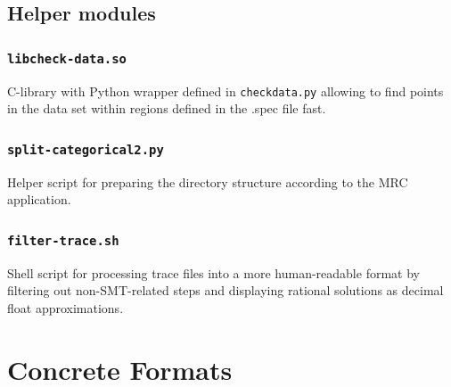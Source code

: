 \documentclass[a4paper,parskip=half]{article} %
\newcommand*\cmdstyle\texttt
\newcommand*\file\cmdstyle
\newcommand*\cmd[1]{\cmdstyle{\textcolor{red!85!black}{#1}}}
\newcommand{\delete}[1]{}
\begin{document}
{\subsection{Helper modules}
\subsubsection{\file{libcheck-data.so}}
C-library with Python wrapper defined in \file{checkdata.py} allowing to find
points in the data set within regions defined in the .spec file fast.

\subsubsection{\cmd{split-categorical2.py}}
Helper script for preparing the directory structure according to the MRC
application.

\subsubsection{\cmd{filter-trace.sh}}
Shell script for processing trace files into a more human-readable format by
filtering out non-SMT-related steps and displaying rational solutions as
decimal float approximations.

} %




\delete{
\begin{thebibliography}{99}
\bibitem{BKK20}
 F. Brauße, Z. Khasidashvili and K. Korovin.
\newblock{Selecting Stable Safe Configurations for Systems Modelled by Neural Networks with ReLU Activation.}
\newblock{2020 Formal Methods in Computer Aided Design, FMCAD 2020}
\newblock{IEEE, 2020}.

\bibitem{BKK22}
 F. Brauße, Z. Khasidashvili and K. Korovin.
\newblock{Combining Constraint Solving and Bayesian Techniques for System Optimization.}  
\newblock{31st International Joint Conference on Artificial Intelligence and the 25th European Conference on Artificial Intelligence, IJCAI-ECAI'22 2022.}


\bibitem{BKK24}
 F. Brauße, Z. Khasidashvili and K. Korovin.
\newblock{SMLP: Symbolic Machine Learning Prover.}
\newblock{Report arXiv: 2402.01415 , 2024.}
\end{thebibliography}
}

\appendix
\section{Concrete Formats}
\end{document}
